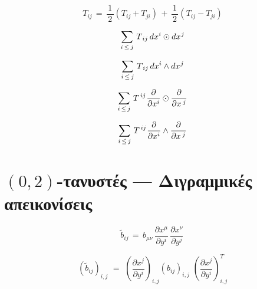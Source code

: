 \documentclass[11pt,a4paper,twoside,openright]{book}
\begin{document}
\begin{equation}
T_{ij}
\,=\,
\frac{1}{\,2\,} \left(T_{ij} + T_{ji}\right)
\,+\,
\frac{1}{\,2\,} \left(T_{ij} - T_{ji}\right)
\end{equation}

\begin{equation}
\sum_{i\, \le\, j}\,T_{\,ij}\,
dx^i \odot dx^{\hspace{.5pt}j}
\end{equation}

\begin{equation}
\sum_{i\, \le\, j}\,T_{\,ij}\,
dx^i \wedge dx^{\hspace{.5pt}j}
\end{equation}

\begin{equation}
\sum_{i\, \le\, j}\,T^{\,ij}\hspace{.5pt}
\frac{\partial}{\partial x^i} \odot
\frac{\partial}{\partial x^{\,\hspace{.5pt}j}} 
\end{equation}

\begin{equation}
\sum_{i\, \le\, j}\,T^{\,ij}\hspace{.5pt}
\frac{\partial}{\partial x^i} \wedge
\frac{\partial}{\partial x^{\,\hspace{.5pt}j}} 
\end{equation}

\section{$(0,2)$-τανυστές --- Διγραμμικές απεικονίσεις}

\begin{equation}\label{eq:bilinear-form-transform}
\tilde{b}_{ij}
\,=\,
b_{\mu \nu}\,
\frac{\partial x^\mu}{\partial y^i}\,
\frac{\partial x^\nu}{\partial y^j}\,
\end{equation}

\begin{equation}\label{eq:bilinear-form-transform-matrix}
(\widetilde{b}_{ij})_{i,j}
\,\,=\,\,
\left(\frac{\partial x^j}{\partial y^i}\right)_{i,j}
(b_{ij})_{i,j}
\,\,
\left(\frac{\partial x^j}{\partial y^i}\right)^{T}_{i,j}
\end{equation}
\end{document}
